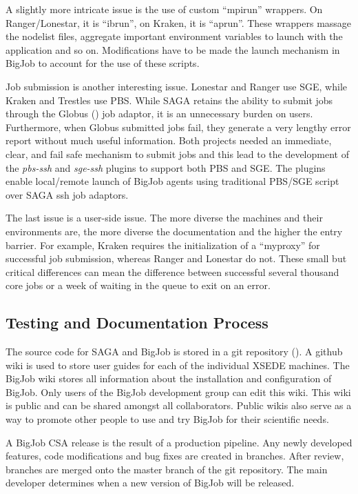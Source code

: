 \documentclass{sig-alternate}
\begin{document}
A slightly more intricate issue is the use of custom ``mpirun'' wrappers. On
Ranger/Lonestar, it is ``ibrun'', on Kraken, it is ``aprun''. These wrappers
massage the nodelist files, aggregate important environment variables to launch
with the application and so on. Modifications have to be made the launch
mechanism in BigJob to account for the use of these scripts.

Job submission is another interesting issue. Lonestar and Ranger use SGE, while
Kraken and Trestles use PBS. While SAGA retains the ability to submit jobs
through the Globus (\cite{Globus}) job adaptor, it is an unnecessary burden on
users. Furthermore, when Globus submitted jobs fail, they generate a very
lengthy error report without much useful information. Both projects needed an
immediate, clear, and fail safe mechanism to submit jobs and this lead to the
development of the \textit{pbs-ssh} and \textit{sge-ssh} plugins to support both
PBS and SGE. The plugins enable local/remote launch of BigJob agents using
traditional PBS/SGE script over SAGA ssh job adaptors.

The last issue is a user-side issue. The more diverse the machines and their
environments are, the more diverse the documentation and the higher the entry
barrier. For example, Kraken requires the initialization of a ``myproxy'' for
successful job submission, whereas Ranger and Lonestar do not. These small  but
critical differences can mean the difference between successful several thousand
core jobs or a week of waiting in the queue to exit on an error.


\subsection{Testing and Documentation Process}

The source code for SAGA and BigJob is stored in a
git repository (\cite{bigjob_web}). A github wiki is used to store user guides
for each of the individual XSEDE machines. The BigJob wiki stores all
information about the installation and configuration of BigJob. Only users of
the BigJob development group can edit this wiki. This wiki is public and can be
shared amongst all collaborators. Public wikis also serve as a way to promote
other people to use and try BigJob for their scientific needs.

A BigJob CSA release is the result of a production pipeline. Any newly developed
features, code modifications and bug fixes are created in branches. After
review, branches are merged onto the master branch of the git repository. The
main developer determines when a new version of BigJob will be released. 
\end{document}
